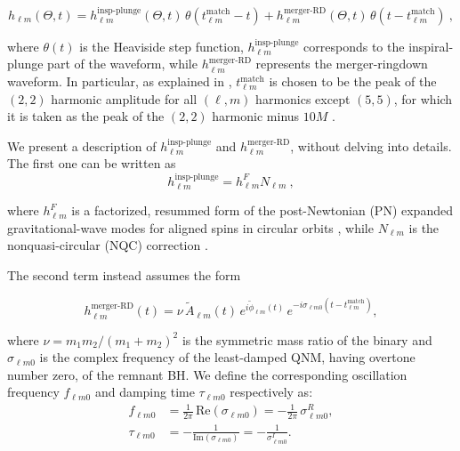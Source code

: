 \begin{equation}
	h_{\ell m}(\Theta, t) = h_{\ell m}^{\text{insp-plunge}}(\Theta, t)\, \theta(t_{\ell m}^{\text{match}} - t) 
+ h_{\ell m}^{\text{merger-RD}}(\Theta, t)\, \theta(t - t_{\ell m}^{\text{match}}) \:,
\end{equation}

\noindent
where $\theta(t)$ is the Heaviside step function, $h^{\text{insp-plunge}}_{\ell m}$ corresponds to the inspiral-plunge part of the waveform, while $h^{\text{merger-RD}}_{\ell m}$ represents the merger-ringdown waveform. In particular, as explained in \cite{pompili2023layingfoundationeffectiveonebodywaveform}, $t^{\text{match}}_{\ell m}$ is chosen to be the peak of the $(2,2)$ harmonic amplitude for all $(\ell, m)$ harmonics except $(5,5)$, for which it is taken as the peak of the $(2,2)$ harmonic minus $10M$ \cite{toubiana2024measuringsourcepropertiesquasinormalmode}.

We present a description of $h^{\text{insp-plunge}}_{\ell m}$ and $h^{\text{merger-RD}}_{\ell m}$, without delving into details. The first one can be written as 
\begin{equation}
h^{\text{insp-plunge}}_{\ell m} = h^{F}_{\ell m} N_{\ell m} \:,
\end{equation}

\noindent
where $h^F_{\ell m}$ is a factorized, resummed form of the post-Newtonian (PN) expanded gravitational-wave modes for aligned spins in circular orbits \cite{Damour_2009, Damour_2007}, while $N_{\ell m}$ is the nonquasi-circular (NQC) correction \cite{pompili2023layingfoundationeffectiveonebodywaveform}.

The second term instead assumes the form

\begin{equation}
h^{\text{merger-RD}}_{\ell m}(t) = \nu \, \tilde{A}_{\ell m}(t) \, e^{i\tilde{\phi}_{\ell m}(t)} \, e^{-i\sigma_{\ell m 0}(t - t^{\text{match}}_{\ell m})},
\end{equation}

\noindent
where $\nu = m_1 m_2/(m_1 + m_2)^2 $ is the symmetric mass ratio of the binary and $\sigma_{\ell m 0}$ is the complex frequency of the least-damped QNM, having overtone number zero, of the remnant BH. We define the corresponding oscillation frequency $f_{\ell m 0}$ and damping time $\tau_{\ell m 0}$ respectively as:
\begin{subequations}
\begin{align}
f_{\ell m 0} &= \frac{1}{2\pi} \, \text{Re}(\sigma_{\ell m 0}) = -\frac{1}{2\pi} \, \sigma^R_{\ell m 0}, \\
\tau_{\ell m 0} &= -\frac{1}{\text{Im}(\sigma_{\ell m 0})} = -\frac{1}{\sigma^I_{\ell m 0}}.
\end{align}
\end{subequations}

